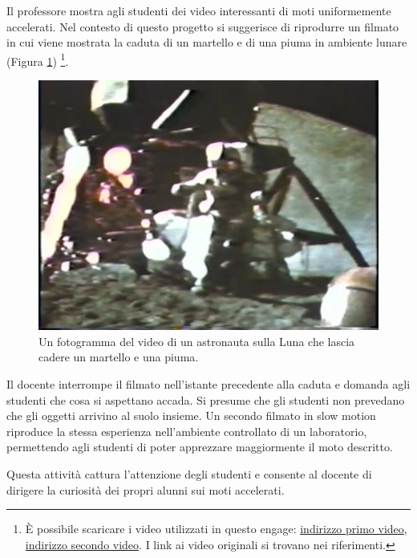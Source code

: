 \documentclass{report} \usepackage[T1]{fontenc} \usepackage[italian]{babel}
\begin{document}
Il professore mostra agli studenti dei video interessanti di moti uniformemente
accelerati. Nel contesto di questo progetto si suggerisce di riprodurre un
filmato in cui viene mostrata la caduta di un martello e di
una piuma in ambiente lunare (Figura \ref{fig:hammer_feather_moon})
\footnote{
          \`E possibile scaricare i video utilizzati in questo engage:
            \textcolor{blue}{\href{https://github.com/savaroskij/PED1/blob/master/progetto_finale/media/video/Hammer-Feather_Moon.mp4?raw=true}{indirizzo primo video}},
            \textcolor{blue}{\href{https://github.com/savaroskij/PED1/blob/master/progetto_finale/media/video/Ball-Feather_Vacuum.mp4?raw=true}{indirizzo secondo video}}.
            I link ai video originali si trovano nei
            riferimenti\cite{moon}\cite{bowling}.
         }.
\begin{figure}[H]
\centering
  \includegraphics[width=\textwidth]{hammer_feather_moon}
  \caption{Un fotogramma del video di un astronauta sulla Luna che lascia
           cadere un martello e una piuma.}
  \label{fig:hammer_feather_moon}
\end{figure}
Il docente interrompe il filmato nell’istante
precedente alla caduta e domanda agli studenti che cosa si aspettano accada. Si
presume che gli studenti non prevedano che gli oggetti arrivino al suolo
insieme.
Un secondo filmato in slow motion riproduce la stessa esperienza nell’ambiente
controllato di un laboratorio, permettendo agli studenti di poter apprezzare
maggiormente il moto descritto.

Questa attività cattura l’attenzione degli studenti e consente al docente
di dirigere la curiosità dei propri alunni sui moti accelerati.
\end{document}
